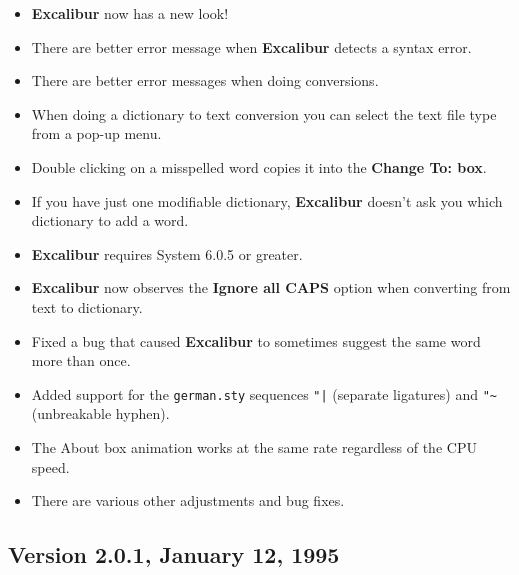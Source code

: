 \documentclass[11pt,titlepage]{article}
\newcommand{\ex}{\textbf{Excalibur}}
\begin{document}
\begin{itemize}
\item \ex{} now has a new look!

\item There are better error message when \ex{} detects a syntax
  error.

\item There are better error messages when doing conversions.

\item When doing a dictionary to text conversion you can select the
  text file type from a pop-up menu.

\item Double clicking on a misspelled word copies it into the
  \textbf{Change To: box}.

\item If you have just one modifiable dictionary, \ex{} doesn't ask
  you which dictionary to add a word.

\item \ex{} requires System 6.0.5 or greater.

\item \ex{} now observes the \textbf{Ignore all CAPS} option when
  converting from text to dictionary.

\item Fixed a bug that caused \ex{} to sometimes suggest the same word
  more than once.

\item Added support for the \texttt{german.sty} sequences \verb+"|+
  (separate ligatures) and \verb+"~+ (unbreakable hyphen).

\item The About box animation works at the same rate regardless of the
  CPU speed.

\item There are various other adjustments and bug fixes.

\end{itemize}

\subsection{Version 2.0.1, January 12, 1995}
\end{document}
